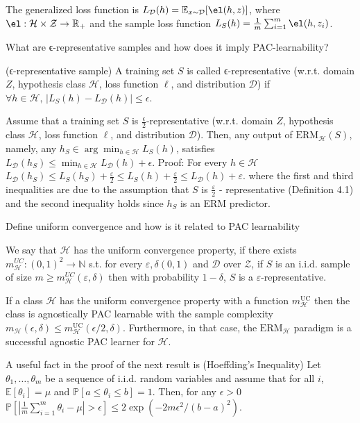 \documentclass[11pt,a4paper,twoside]{article}
\begin{document}
The generalized loss function is
\( L_{\mathcal{D}}(h) = \mathbb{E}_{x \sim \mathcal{D}}[\el(h, z)] \),
where \( \el : \mathcal{H} \times \mathcal{Z} \to \mathbb{R}_{+} \) and the sample loss function
\( L_S(h) = \frac{1}{m} \sum_{i=1}^m \el(h, z_i) \).

What are ϵ-representative samples and how does it imply PAC-learnability?

(ϵ-representative sample) A training set \(S\) is called ϵ-representative (w.r.t. domain \(Z\), 
hypothesis class \(\mathcal{H}\), loss function \(\ell\), and distribution \(\mathcal{D}\)) if 
\(\forall h \in \mathcal{H}, \, |L_{S}(h) - L_{\mathcal{D}}(h)| \leq ϵ.\)

Assume that a training set \(S\) is \(\frac{ϵ}{2}\)-representative (w.r.t. domain \(Z\), 
hypothesis class \(\mathcal{H}\), loss function \(\ell\), and distribution \(\mathcal{D}\)). 
Then, any output of \(\text{ERM}_{\mathcal{H}}(S)\), namely, any \(h_{S} \in \arg\min_{h \in \mathcal{H}} L_{S}(h)\), 
satisfies 
\(L_{\mathcal{D}}(h_{S}) \leq \min_{h \in \mathcal{H}} L_{\mathcal{D}}(h) + ϵ.\)
Proof:
For every \( h \in \mathcal{H} \)
\( L_{\mathcal{D}}(h_S) \leq L_S(h_S) + \frac{\varepsilon}{2} \leq L_S(h) + \frac{\varepsilon}{2} \leq L_{\mathcal{D}}(h) + \varepsilon \).
where the first and third inequalities are due to the assumption that \( S \) is \( \frac{\varepsilon}{2} \) -
representative (Definition 4.1) and the second inequality holds since \( h_S \) is an ERM predictor.



Define uniform convergence and how is it related to PAC learnability

We say that \( \mathcal{H} \) has the uniform convergence property, if there exists 
\( m_{\mathcal{H}}^{UC} : (0, 1)^2 \to \mathbb{N} \) s.t. for every \( \varepsilon, \delta (0, 1) \)
and \( \mathcal{D} \) over \( \mathcal{Z} \), if \( S \) is an i.i.d. sample of size \( m \geq m_{\mathcal{H}}^{UC}(\varepsilon, \delta) \)
then with probability \( 1 - \delta \), \( S \) is a \( \varepsilon \)-representative.

If a class \(\mathcal{H}\) has the uniform convergence property with a function \(m_{\mathcal{H}}^{\text{UC}}\) 
then the class is agnostically PAC learnable with the sample complexity \(m_{\mathcal{H}}(ϵ, δ) \leq m_{\mathcal{H}}^{\text{UC}}(ϵ/2, δ)\). 
Furthermore, in that case, the \(\text{ERM}_{\mathcal{H}}\) paradigm is a successful agnostic PAC learner for \(\mathcal{H}\).

A useful fact in the proof of the next result is
(Hoeffding's Inequality) 
Let \(\theta_1, \ldots, \theta_m\) be a sequence of i.i.d. random variables and assume that for all \(i\), 
\(\mathbb{E}[\theta_i] = \mu\) and \(\mathbb{P}[a \leq \theta_i \leq b] = 1\). Then, for any \(ϵ > 0\)
\(
\mathbb{P} \left[ \left| \frac{1}{m} \sum_{i=1}^{m} \theta_i - \mu \right| > ϵ \right] \leq 2 \exp \left( -2mϵ^2 / (b-a)^2 \right).
\)
\end{document}
